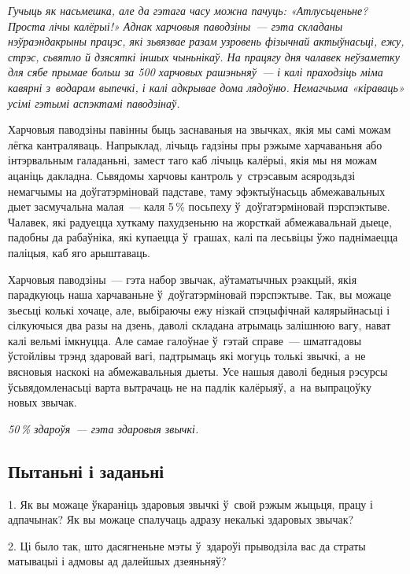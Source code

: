 \emph{Гучыць як насьмешка, але да гэтага часу можна пачуць: «Атлусьценьне? Проста лічы калёрыі!» Аднак харчовыя паводзіны~--- гэта складаны нэўраэндакрыны працэс, які зьвязвае разам узровень фізычнай актыўнасьці, ежу, стрэс, сьвятло й дзясяткі іншых чыньнікаў. На працягу дня чалавек неўзаметку для сябе прымае больш за 500 харчовых рашэньняў~--- і калі праходзіць міма кавярні з~водарам выпечкі, і калі адкрывае дома лядоўню. Немагчыма «кіраваць» усімі гэтымі аспэктамі паводзінаў.}


Харчовыя паводзіны павінны быць заснаваныя на звычках, якія мы самі можам лёгка кантраляваць. Напрыклад, лічыць гадзіны пры рэжыме харчаваньня або інтэрвальным галаданьні, замест таго каб лічыць калёрыі, якія мы ня можам ацаніць дакладна. Сьвядомы харчовы кантроль у~стрэсавым асяродзьдзі немагчымы на доўгатэрміновай падставе, таму эфэктыўнасьць абмежавальных дыет засмучальна малая~--- каля 5\,\% посьпеху ў~доўгатэрміновай пэрспэктыве. Чалавек, які радуецца хуткаму пахудзеньню на жорсткай абмежавальнай дыеце, падобны да рабаўніка, які купаецца ў~грашах, калі па лесьвіцы ўжо паднімаецца паліцыя, каб яго арыштаваць.

Харчовыя паводзіны~--- гэта набор звычак, аўтаматычных рэакцый, якія парадкуюць наша харчаваньне ў~доўгатэрміновай пэрспэктыве. Так, вы можаце зьесьці колькі хочаце, але, выбіраючы ежу нізкай спэцыфічнай калярыйнасьці і сілкуючыся два разы на дзень, даволі складана атрымаць залішнюю вагу, нават калі вельмі імкнуцца. Але самае галоўнае ў~гэтай справе~--- шматгадовы ўстойлівы трэнд здаровай вагі, падтрымаць які могуць толькі звычкі, а~не вясновыя наскокі на абмежавальныя дыеты. Усе нашыя даволі бедныя рэсурсы ўсьвядомленасьці варта вытрачаць не на падлік калёрыяў, а~на выпрацоўку новых звычак. 

\emph{50\,\% здароўя~--- гэта здаровыя звычкі.}

\subsection*{Пытаньні і заданьні}

1. Як вы можаце ўкараніць здаровыя звычкі ў~свой рэжым жыцьця, працу і адпачынак? Як вы можаце спалучаць адразу некалькі здаровых звычак?

2. Ці было так, што дасягненьне мэты ў~здароўі прыводзіла вас да страты матывацыі і адмовы ад далейшых дзеяньняў?

